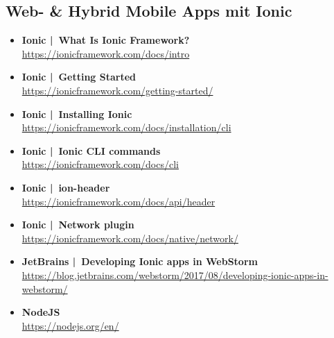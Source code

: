 \documentclass[a4paper]{article}
\begin{document}
{\begin{itemize}
	\end{itemize}

	\newpage

	\subsection{Web- \& Hybrid Mobile Apps mit Ionic}
	
	\begin{itemize}
		
		\item \textbf{Ionic | What Is Ionic Framework?}\\
		\href{https://ionicframework.com/docs/intro}
		{https://ionicframework.com/docs/intro}
		
		\item \textbf{Ionic | Getting Started}\\
		\href{https://ionicframework.com/getting-started/}
		{https://ionicframework.com/getting-started/}
				
		\item \textbf{Ionic | Installing Ionic}\\
		\href{https://ionicframework.com/docs/installation/cli}
		{https://ionicframework.com/docs/installation/cli}
		
		\item \textbf{Ionic | Ionic CLI commands}\\
		\href{https://ionicframework.com/docs/cli}
		{https://ionicframework.com/docs/cli}
				
		\item \textbf{Ionic | ion-header}\\
		\href{https://ionicframework.com/docs/api/header}
		{https://ionicframework.com/docs/api/header}
				
		\item \textbf{Ionic | Network plugin}\\
		\href{https://ionicframework.com/docs/native/network/}
		{https://ionicframework.com/docs/native/network/}
		
		\item \textbf{JetBrains | Developing Ionic apps in WebStorm}\\
		\href{https://blog.jetbrains.com/webstorm/2017/08/developing-ionic-apps-in-webstorm/}
		{https://blog.jetbrains.com/webstorm/2017/08/developing-ionic-apps-in-webstorm/}
		
		\item \textbf{NodeJS}\\
		\href{https://nodejs.org/en/}
		{https://nodejs.org/en/}
		

\end{itemize}}
\end{document}

